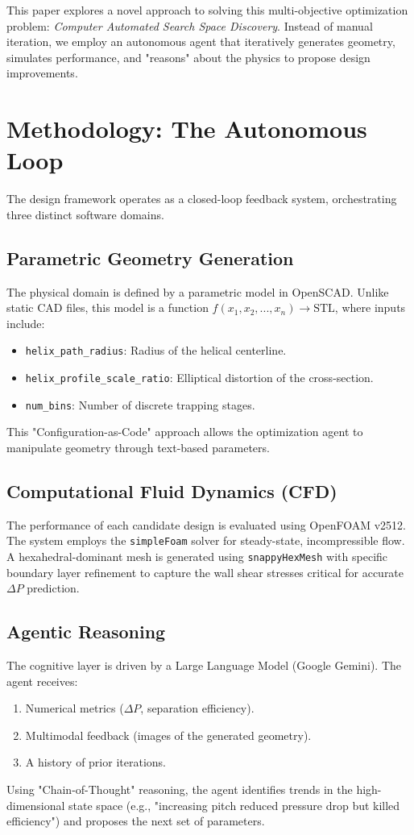 \documentclass[twocolumn]{article}
\begin{document}
This paper explores a novel approach to solving this multi-objective optimization problem: \textit{Computer Automated Search Space Discovery}. Instead of manual iteration, we employ an autonomous agent that iteratively generates geometry, simulates performance, and "reasons" about the physics to propose design improvements.

\section{Methodology: The Autonomous Loop}

The design framework operates as a closed-loop feedback system, orchestrating three distinct software domains.

\subsection{Parametric Geometry Generation}
The physical domain is defined by a parametric model in OpenSCAD. Unlike static CAD files, this model is a function $f(x_1, x_2, ..., x_n) \rightarrow \text{STL}$, where inputs include:
\begin{itemize}
    \item \texttt{helix\_path\_radius}: Radius of the helical centerline.
    \item \texttt{helix\_profile\_scale\_ratio}: Elliptical distortion of the cross-section.
    \item \texttt{num\_bins}: Number of discrete trapping stages.
\end{itemize}
This "Configuration-as-Code" approach allows the optimization agent to manipulate geometry through text-based parameters.

\subsection{Computational Fluid Dynamics (CFD)}
The performance of each candidate design is evaluated using OpenFOAM v2512. The system employs the \texttt{simpleFoam} solver for steady-state, incompressible flow. A hexahedral-dominant mesh is generated using \texttt{snappyHexMesh} with specific boundary layer refinement to capture the wall shear stresses critical for accurate $\Delta P$ prediction.

\subsection{Agentic Reasoning}
The cognitive layer is driven by a Large Language Model (Google Gemini). The agent receives:
\begin{enumerate}
    \item Numerical metrics ($\Delta P$, separation efficiency).
    \item Multimodal feedback (images of the generated geometry).
    \item A history of prior iterations.
\end{enumerate}
Using "Chain-of-Thought" reasoning, the agent identifies trends in the high-dimensional state space (e.g., "increasing pitch reduced pressure drop but killed efficiency") and proposes the next set of parameters.
\end{document}
